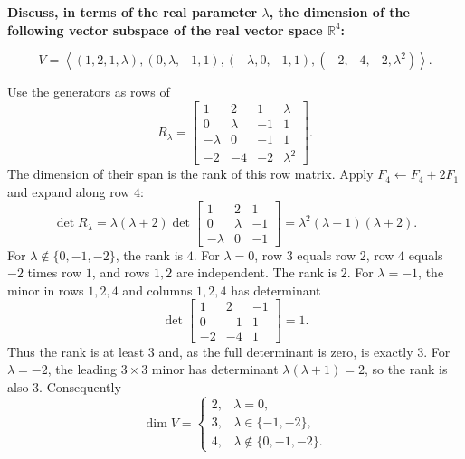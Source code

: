 \providecommand{\rank}{\operatorname{r}}
\providecommand{\RR}{\mathbb R}
\providecommand{\CC}{\mathbb C}
\providecommand{\KK}{\mathbb K}

\setcounter{enumi}{88}
\item {\bfseries\boldmath
Discuss, in terms of the real parameter $\lambda$, the dimension of the following vector subspace of the real vector space $\RR^4$:
}

\[
V=\left\langle(1,2,1,\lambda),(0,\lambda,-1,1),(-\lambda,0,-1,1),(-2,-4,-2,\lambda^2)\right\rangle.
\]

\begin{answer}
Use the generators as rows of
\[
 R_\lambda=\begin{bmatrix}
 1&2&1&\lambda\\0&\lambda&-1&1\\-\lambda&0&-1&1\\-2&-4&-2&\lambda^2
 \end{bmatrix}.
\]
The dimension of their span is the rank of this row matrix.
Apply $F_4\gets F_4+2F_1$ and expand along row $4$:
\[
 \det R_\lambda=\lambda(\lambda+2)
 \det\begin{bmatrix}1&2&1\\0&\lambda&-1\\-\lambda&0&-1\end{bmatrix}
 =\lambda^2(\lambda+1)(\lambda+2).
\]
For $\lambda\notin\{0,-1,-2\}$, the rank is $4$.
For $\lambda=0$, row $3$ equals row $2$, row $4$ equals $-2$ times row $1$,
and rows $1,2$ are independent. The rank is $2$.
For $\lambda=-1$, the minor in rows $1,2,4$ and columns $1,2,4$ has determinant
\[
 \det\begin{bmatrix}1&2&-1\\0&-1&1\\-2&-4&1\end{bmatrix}=1.
\]
Thus the rank is at least $3$ and, as the full determinant is zero, is exactly $3$.
For $\lambda=-2$, the leading $3\times3$ minor has determinant
$\lambda(\lambda+1)=2$, so the rank is also $3$.
Consequently
\[
 \boxed{\dim V=\begin{cases}
 2,&\lambda=0,\\3,&\lambda\in\{-1,-2\},\\
 4,&\lambda\notin\{0,-1,-2\}.
 \end{cases}}
\]
\end{answer}
